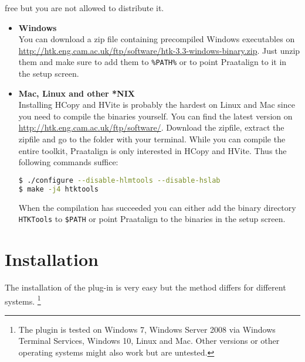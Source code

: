 \begin{itemize}
		free but you are not allowed to distribute it.
		\begin{itemize}
			\item \textbf{Windows}\\
				You can download a zip file containing precompiled Windows executables
				on \url{http://htk.eng.cam.ac.uk/ftp/software/htk-3.3-windows-binary.zip}.
				Just unzip them and make sure to add them to \texttt{\%PATH\%} or to
				point Praatalign to it in the setup screen.
			\item \textbf{Mac, Linux and other *NIX}\\
				Installing HCopy and HVite is probably the hardest on Linux and Mac
				since you need to compile the binaries yourself. You can find the
				latest version on \url{http://htk.eng.cam.ac.uk/ftp/software/}.
				Download the zipfile, extract the zipfile and go to the folder with
				your terminal. While you can compile the entire toolkit, Praatalign is
				only interested in HCopy and HVite. Thus the following commands
				suffice:
				\begin{lstlisting}[language=bash]
$ ./configure --disable-hlmtools --disable-hslab
$ make -j4 htktools
				\end{lstlisting}
				When the compilation has succeeded you can either add the binary
				directory \texttt{HTKTools} to \texttt{\$PATH} or point Praatalign to
				the binaries in the setup screen.
		\end{itemize}
\end{itemize}

\section{Installation}
\label{sec:installation}
The installation of the plug-in is very easy but the method differs for
different systems. \footnote{The plugin is tested on Windows 7, Windows Server
2008 via Windows Terminal Services, Windows 10, Linux and Mac. Other versions
or other operating systems might also work but are untested.}

